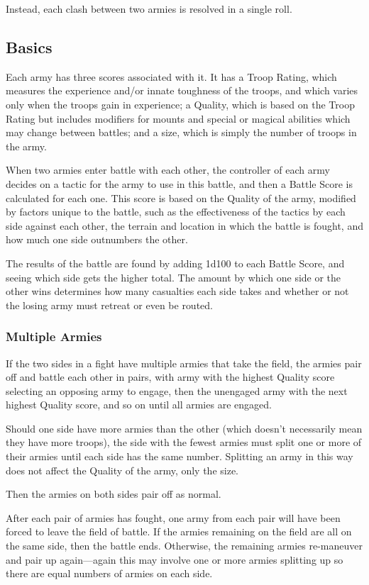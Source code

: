 \begin{multicols*}{2}
Instead, each clash between two armies is resolved in a single roll.

\subsection{Basics}
Each army has three scores associated with it. It has a Troop Rating, which measures the experience and/or innate toughness of the troops, and which varies only when the troops gain in experience; a Quality, which is based on the Troop Rating but includes modifiers for mounts and special or magical abilities which may change between battles; and a size, which is simply the number of troops in the army.

When two armies enter battle with each other, the controller of each army decides on a tactic for the army to use in this battle, and then a Battle Score is calculated for each one. This score is based on the Quality of the army, modified by factors unique to the battle, such as the effectiveness of the tactics by each side against each other, the terrain and location in which the battle is fought, and how much one side outnumbers the other.

The results of the battle are found by adding 1d100 to each Battle Score, and seeing which side gets the higher total. The amount by which one side or the other wins determines how many casualties each side takes and whether or not the losing army must retreat or even be routed.

\subsubsection{Multiple Armies}
If the two sides in a fight have multiple armies that take the field, the armies pair off and battle each other in pairs, with army with the highest Quality score selecting an opposing army to engage, then the unengaged army with the next highest Quality score, and so on until all armies are engaged.

Should one side have more armies than the other (which doesn’t necessarily mean they have more troops), the side with the fewest armies must split one or more of their armies until each side has the same number. Splitting an army in this way does not affect the Quality of the army, only the size.

Then the armies on both sides pair off as normal.

After each pair of armies has fought, one army from each pair will have been forced to leave the field of battle. If the armies remaining on the field are all on the same side, then the battle ends. Otherwise, the remaining armies re-maneuver and pair up again—again this may involve one or more armies splitting up so there are equal numbers of armies on each side.


\end{multicols*}
